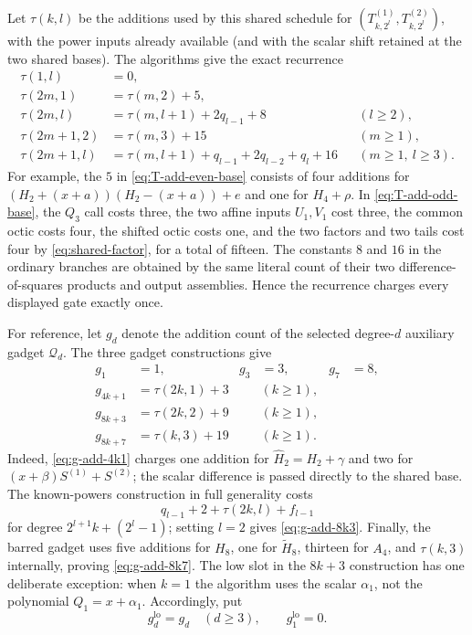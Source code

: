Let $\tau(k,l)$ be the additions used by this shared schedule for
$(T^{(1)}_{k,2^l},T^{(2)}_{k,2^l})$, with the power inputs already
available (and with the scalar shift retained at the two shared bases).
The algorithms give the exact recurrence
\begin{align}
 \tau(1,l)&=0, \label{eq:T-add-one}\\
 \tau(2m,1)&=\tau(m,2)+5, \label{eq:T-add-even-base}\\
 \tau(2m,l)&=\tau(m,l+1)+2q_{l-1}+8
     &&(l\ge2), \label{eq:T-add-even}\\
 \tau(2m+1,2)&=\tau(m,3)+15
     &&(m\ge1), \label{eq:T-add-odd-base}\\
 \tau(2m+1,l)&=\tau(m,l+1)+q_{l-1}+2q_{l-2}+q_l+16
     &&(m\ge1,\ l\ge3). \label{eq:T-add-odd}
\end{align}
For example, the $5$ in \eqref{eq:T-add-even-base} consists of four
additions for
$(H_2+(x+a))(H_2-(x+a))+e$ and one for $H_4+\rho$.
In \eqref{eq:T-add-odd-base}, the $Q_3$ call costs three, the two affine
inputs $U_1,V_1$ cost three, the common octic costs four, the shifted octic
costs one, and the two factors and two tails cost four by
\eqref{eq:shared-factor}, for a total of fifteen.
The constants $8$ and $16$ in the ordinary branches are obtained by the
same literal count of their two difference-of-squares products and output
assemblies.  Hence the recurrence charges every displayed gate exactly once.

For reference, let $g_d$ denote the addition count of the selected
degree-$d$ auxiliary gadget $\mathcal Q_d$.  The three gadget constructions
give
\begin{align}
 g_1&=1,&g_3&=3,&g_7&=8,\label{eq:g-add-bases}\\
 g_{4k+1}&=\tau(2k,1)+3 &&(k\ge1),\label{eq:g-add-4k1}\\
 g_{8k+3}&=\tau(2k,2)+9 &&(k\ge1),\label{eq:g-add-8k3}\\
 g_{8k+7}&=\tau(k,3)+19 &&(k\ge1).\label{eq:g-add-8k7}
\end{align}
Indeed, \eqref{eq:g-add-4k1} charges one addition for
$\widehat H_2=H_2+\gamma$ and two for
$(x+\beta)S^{(1)}+S^{(2)}$; the scalar difference is passed directly to
the shared base.  The known-powers construction in full generality costs
\[
 q_{l-1}+2+\tau(2k,l)+f_{l-1}
 \tag{known-powers-additions}
\]
for degree $2^{l+1}k+(2^l-1)$; setting $l=2$ gives
\eqref{eq:g-add-8k3}.  Finally, the barred gadget uses five additions for
$H_8$, one for $\widetilde H_8$, thirteen for $A_4$, and
$\tau(k,3)$ internally, proving \eqref{eq:g-add-8k7}.
The low slot in the $8k+3$ construction has one deliberate exception:
when $k=1$ the algorithm uses the scalar $\alpha_1$, not the polynomial
$Q_1=x+\alpha_1$.  Accordingly, put
\[
  g_d^{\mathrm{lo}}=g_d\quad(d\ge3),
  \qquad g_1^{\mathrm{lo}}=0.
\]

